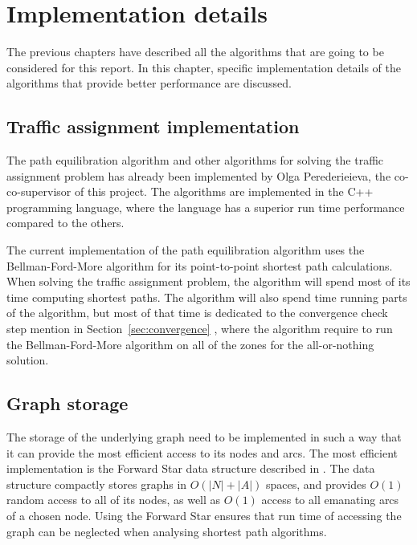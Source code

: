 \chapter{Implementation details} \label{chap:implementation}

The previous chapters have described all the algorithms that are going to be considered for this report. 
In this chapter, specific implementation details of the algorithms that provide better performance are discussed.

\section{Traffic assignment implementation}
The path equilibration algorithm and other algorithms for solving the traffic assignment problem has already been implemented by Olga Perederieieva, the co-co-supervisor of this project.
The algorithms are implemented in the C++ programming language,
where the language has a superior run time performance compared to the others.

The current implementation of the path equilibration algorithm uses the Bellman-Ford-More algorithm for its point-to-point shortest path calculations.
When solving the traffic assignment problem,
the algorithm will spend most of its time computing shortest paths.
The algorithm will also spend time running parts of the algorithm,
but most of that time is dedicated to the convergence check step mention in Section~\ref{sec:convergence} ,
where the algorithm require to run the Bellman-Ford-More algorithm on all of the zones for the all-or-nothing solution.

\section{Graph storage}
The storage of the underlying graph need to be implemented in such a way that it can provide the most efficient access to its nodes and arcs.
The most efficient implementation is the Forward Star data structure described in \citet{Sheffi}.
The data structure compactly stores graphs in $O(|N|+|A|)$ spaces,
and provides $O(1)$ random access to all of its nodes,
as well as $O(1)$ access to all emanating arcs of a chosen node.
Using the Forward Star ensures that run time of accessing the graph can be neglected when analysing shortest path algorithms.

